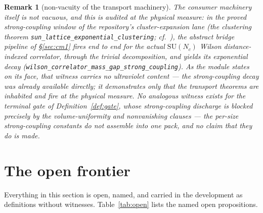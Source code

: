 \documentclass[11pt]{article}
\newtheorem{remark}[theorem]{Remark}
\theoremstyle{definition}
\newcommand{\lean}[1]{\texttt{#1}}
\newcommand{\SU}{\mathrm{SU}}
\begin{document}
\begin{remark}[non-vacuity of the transport machinery]
\label{rem:nonvacuity}
The consumer machinery itself is not vacuous, and this is audited at
the physical measure: in the proved strong-coupling window of the
repository's cluster-expansion lane (the clustering theorem
\lean{sun\_lattice\_exponential\_clustering}; cf.\
\cite{ErikssonAL,OS78}), the \emph{abstract} bridge pipeline of
\S\ref{sec:cm1} fires end to end for the actual $\SU(N_c)$ Wilson
distance-indexed correlator, through the trivial decomposition, and
yields its exponential decay
(\lean{wilson\_correlator\_mass\_gap\_strong\_coupling}).  As the
module states on its face, that witness carries \emph{no} ultraviolet
content --- the strong-coupling decay was already available directly;
it demonstrates only that the transport theorems are inhabited and
fire at the physical measure.  No analogous witness exists for the
terminal gate of Definition~\ref{def:gate}, whose strong-coupling
discharge is blocked precisely by the volume-uniformity and
nonvanishing clauses --- the per-size strong-coupling constants do not
assemble into one pack, and no claim that they do is made.
\end{remark}

\section{The open frontier}\label{sec:frontier}

Everything in this section is open, named, and carried in the
development as definitions without witnesses.  Table~\ref{tab:open}
lists the named open propositions.
\end{document}
